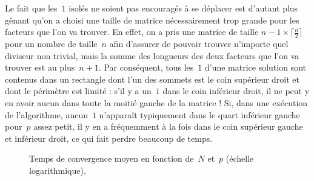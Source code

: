 \documentclass[11pt, openany, a4paper]{article}
\begin{document}
\medskip
 
Le fait que les~$1$ isolés ne soient pas encouragés à se déplacer est d'autant plus gênant qu'on a choisi une taille de matrice nécessairement trop grande pour les facteurs que l'on va trouver. En effet, on a pris une matrice de taille $n-1 \times \lceil \frac{n}{2} \rceil$ pour un nombre de taille~$n$ afin d'assurer de pouvoir trouver n'importe quel diviseur non trivial, mais la somme des longueurs des deux facteurs que l'on va trouver est au plus~$n+1$. Par conséquent, tous les~$1$ d'une matrice solution sont contenus dans un rectangle dont l'un des sommets est le coin supérieur droit et dont le périmètre est limité : s'il y a un~$1$ dans le coin inférieur droit, il ne peut y en avoir aucun dans toute la moitié gauche de la matrice ! Si, dans une exécution de l'algorithme, aucun~$1$ n'apparaît typiquement dans le quart inférieur gauche pour~$p$ assez petit, il y en a fréquemment à la fois dans le coin supérieur gauche et inférieur droit, ce qui fait perdre beaucoup de temps. 


\begin{figure}
  \centering
  \caption{Temps de convergence moyen en fonction de~$N$ et~$p$ (échelle logarithmique).}
  \label{fig:p_ag}
\end{figure}  
\end{document}
